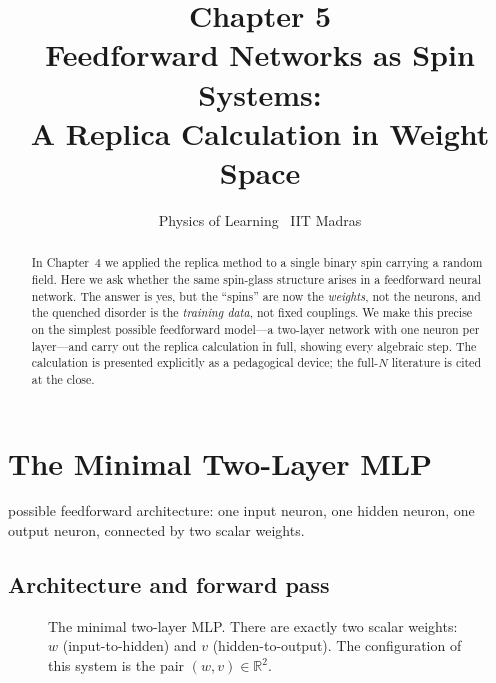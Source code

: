 \documentclass[nobib,justified]{tufte-handout}
\title[Feedforward Networks as Spin Systems]{Chapter 5\\
  \Large Feedforward Networks as Spin Systems:\\
  A Replica Calculation in Weight Space}
\author{Physics of Learning \textbullet\ IIT Madras}
\date{}
\newcommand{\RR}{\mathbb{R}}
\begin{document}
\maketitle

\begin{abstract}
\noindent
In Chapter~4 we applied the replica method to a single binary spin
carrying a random field.  Here we ask whether the same spin-glass
structure arises in a feedforward neural network.  The answer is yes,
but the ``spins'' are now the \emph{weights}, not the neurons, and the
quenched disorder is the \emph{training data}, not fixed couplings.  We
make this precise on the simplest possible feedforward model---a
two-layer network with one neuron per layer---and carry out the replica
calculation in full, showing every algebraic step.  The calculation is
presented explicitly as a pedagogical device; the full-$N$ literature is
cited at the close.
\end{abstract}

\section{The Minimal Two-Layer MLP}

 possible feedforward architecture:
one input neuron, one hidden neuron, one output neuron, connected by two
scalar weights.

\subsection*{Architecture and forward pass}

\begin{figure}[h]
\centering
{}
\caption{The minimal two-layer MLP.  There are exactly two scalar
  weights: $w$ (input-to-hidden) and $v$ (hidden-to-output).  The
  configuration of this system is the pair $(w,v)\in\RR^{2}$.}
\label{fig:mlp}
\end{figure}
\end{document}
